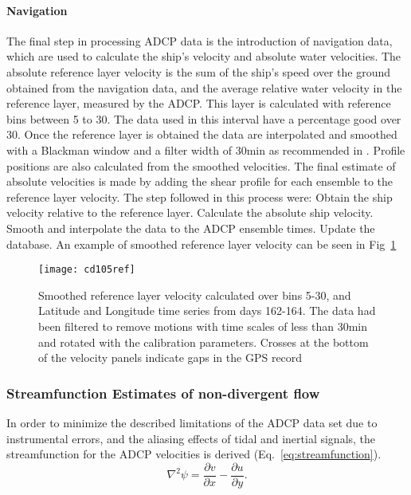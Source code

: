 \paragraph{Navigation} The final step in processing ADCP data is the
introduction of navigation data, which are used to calculate the
ship's velocity and absolute water velocities. The absolute
reference layer velocity is the sum of the ship's speed over the
ground obtained from the navigation data, and the average relative
water velocity in the reference layer, measured by the ADCP.  This
layer is calculated with reference bins between 5 to 30. The data
used in this interval have a percentage good over 30. Once the
reference layer is obtained the data are interpolated and smoothed
with a Blackman window and a filter width of 30min as recommended
in \citet{Codas}. Profile positions are also calculated from the
smoothed velocities. The final estimate of absolute velocities is
made by adding the shear profile for each ensemble to the
reference layer velocity. The step followed in this process were:
Obtain  the ship velocity relative to the reference layer.
Calculate the absolute ship velocity. Smooth and interpolate the
data to the ADCP ensemble times. Update the database. An example
of smoothed reference layer velocity can be seen in
Fig~\ref{fig:cd105ref}
\begin{figure}
  \centering
  \texttt{[image: cd105ref]}
  \caption{Smoothed reference layer velocity calculated over bins 5-30, and
  Latitude and Longitude time series from days 162-164.
  The data had been filtered to remove motions with time scales of less
  than 30min and rotated with the calibration parameters.
  Crosses at the bottom of the velocity panels
  indicate gaps in the GPS record}\label{fig:cd105ref}
\end{figure}

\subsubsection{Streamfunction Estimates of non-divergent flow}
In order to minimize the described limitations of the ADCP data
set due to instrumental errors, and the aliasing effects of tidal
and inertial signals, the streamfunction for the ADCP velocities
is derived (Eq.~\ref{eq:streamfunction}).
\begin{equation}\label{eq:streamfunction}
  \nabla^{2}\psi=\frac{\partial v}{\partial x} - \frac{\partial
  u}{\partial y}.
\end{equation}


